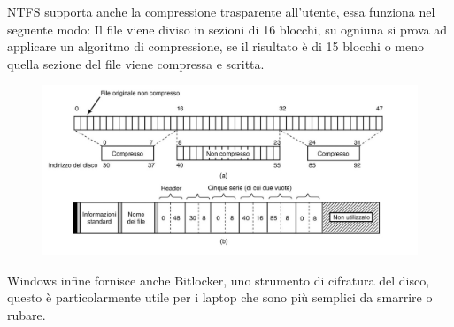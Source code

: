 NTFS supporta anche la compressione trasparente all'utente, essa funziona nel seguente modo:
Il file viene diviso in sezioni di 16 blocchi, su ogniuna si prova ad applicare un algoritmo di compressione, se il risultato è di 15 blocchi o meno quella sezione del file viene compressa e scritta.

\begin{figure}[H]
    \centering
    \includegraphics[width=0.75\linewidth]{assets/windows-MFT-compression.jpeg}
\end{figure}

Windows infine fornisce anche Bitlocker, uno strumento di cifratura del disco, questo è particolarmente utile per i laptop che sono più semplici da smarrire o rubare.